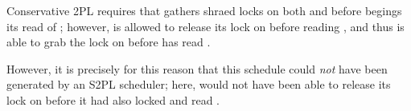 Conservative 2PL requires that  gathers shraed locks on both  and
 before begings its read of ; however,  is allowed to release
its lock on  before reading , and thus  is able to grab the
lock on  before  has read .
\medskip

However, it is precisely for this reason that this schedule could \textit{not}
have been generated by an S2PL scheduler; here,  would not have been able
to release its lock on  before it had also locked and read .



\tykstreg
